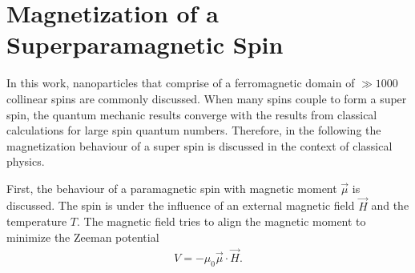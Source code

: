 \documentclass[\main/dresen_thesis.tex]{subfiles}
\begin{document}
\section{Magnetization of a Superparamagnetic Spin}\label{ch:appendix:calculations:magnetizationClassicalSpin}
In this work, nanoparticles that comprise of a ferromagnetic domain of $\gg 1000$ collinear spins are commonly discussed.
When many spins couple to form a super spin, the quantum mechanic results converge with the results from classical calculations for large spin quantum numbers.
Therefore, in the following the magnetization behaviour of a super spin is discussed in the context of classical physics.

First, the behaviour of a paramagnetic spin with magnetic moment $\vec{\mu}$ is discussed.
The spin is under the influence of an external magnetic field $\vec{H}$ and the temperature $T$.
The magnetic field tries to align the magnetic moment to minimize the Zeeman potential
\begin{align}
  V = - \mu_0 \vec{\mu} \cdot \vec{H}.
\end{align}
\end{document}
